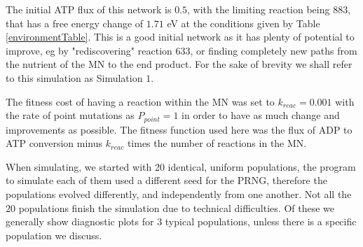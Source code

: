 \documentclass[10pt,a4paper]{article}
\begin{document}
The initial ATP flux of this network is $0.5$, with the limiting reaction being $883$, that has a free energy change of $1.71$ eV at the conditions given by Table \ref{environmentTable}. This is a good initial network as it has plenty of potential to improve, eg by "rediscovering" reaction $633$, or finding completely new paths from the nutrient of the MN to the end product. For the sake of brevity we shall refer to this simulation as Simulation $1$.

The fitness cost of having a reaction within the MN was set to $k_{reac}=0.001$ with the rate of point mutations as $P_{point}=1$ in order to have as much change and improvements as possible. The fitness function used here was the flux of ADP to ATP conversion minus $k_{reac}$ times the number of reactions in the MN.

When simulating, we started with 20 identical, uniform populations, the program to simulate each of them used a different seed for the PRNG, therefore the populations evolved differently, and independently from one another. Not all the 20 populations finish the simulation due to technical difficulties. Of these we generally show diagnostic plots for 3 typical populations, unless there is a specific population we discuss. 
\end{document}
